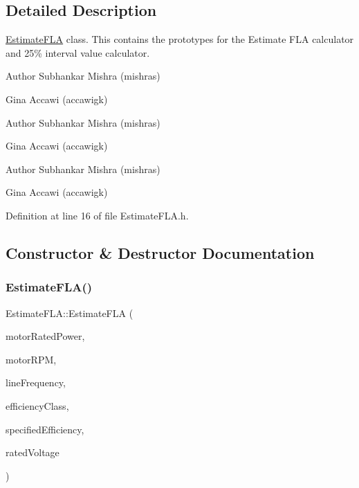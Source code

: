 \subsection{Detailed Description}
\hyperlink{class_estimate_f_l_a}{Estimate\+F\+LA} class. This contains the prototypes for the Estimate F\+LA calculator and 25\% interval value calculator. 

\begin{DoxyAuthor}{Author}
Subhankar Mishra (mishras) 

Gina Accawi (accawigk) 
\end{DoxyAuthor}


\begin{DoxyAuthor}{Author}
Subhankar Mishra (mishras) 

Gina Accawi (accawigk) 
\end{DoxyAuthor}


\begin{DoxyAuthor}{Author}
Subhankar Mishra (mishras) 

Gina Accawi (accawigk) 
\end{DoxyAuthor}


Definition at line 16 of file Estimate\+F\+L\+A.\+h.



\subsection{Constructor \& Destructor Documentation}
\mbox{\label{class_estimate_f_l_a_ace098c4a684eb4926b20322cf65da32d}} 
\subsubsection{\texorpdfstring{Estimate\+F\+L\+A()}{EstimateFLA()}\hspace{0.1cm}{\footnotesize\ttfamily [1/3]}}
{\footnotesize\ttfamily Estimate\+F\+L\+A\+::\+Estimate\+F\+LA (\begin{DoxyParamCaption}\item[{double}]{motor\+Rated\+Power,  }\item[{double}]{motor\+R\+PM,  }\item[{Motor\+::\+Line\+Frequency}]{line\+Frequency,  }\item[{Motor\+::\+Efficiency\+Class}]{efficiency\+Class,  }\item[{double}]{specified\+Efficiency,  }\item[{double}]{rated\+Voltage }\end{DoxyParamCaption})\hspace{0.3cm}{\ttfamily [inline]}}

